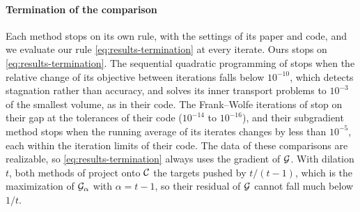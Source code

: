 \documentclass[main.tex]{subfiles}
\begin{document}
\paragraph{Termination of the comparison}
Each method stops on its own rule, with the settings of its paper and code, and we evaluate our rule \eqref{eq:results-termination} at every iterate.
Ours stops on \eqref{eq:results-termination}.
The sequential quadratic programming of \citet{Bourne2025Inverting} stops when the relative change of its objective between iterations falls below $10^{-10}$, which detects stagnation rather than accuracy, and solves its inner transport problems to $10^{-3}$ of the smallest volume, as in their code.
The Frank--Wolfe iterations of \citet{Bourne2026ConvexOrder} stop on their gap at the tolerances of their code ($10^{-14}$ to $10^{-16}$), and their subgradient method stops when the running average of its iterates changes by less than $10^{-5}$, each within the iteration limits of their code.
The data of these comparisons are realizable, so \eqref{eq:results-termination} always uses the gradient of $\mathcal{G}$.
With dilation $t$, both methods of \citet{Bourne2026ConvexOrder} project onto $\mathcal{C}$ the targets pushed by $t/(t-1)$, which is the maximization of $\mathcal{G}_\alpha$ with $\alpha \!=\! t - 1$, so their residual of $\mathcal{G}$ cannot fall much below $1/t$.

\end{document}
